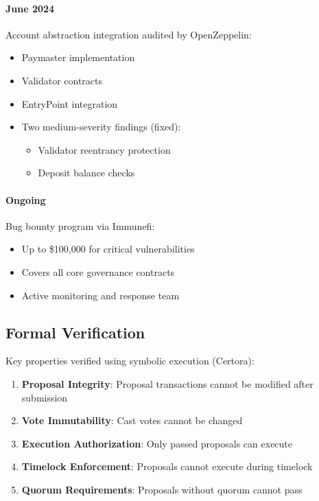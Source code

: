 \documentclass[11pt,a4paper]{article}
\begin{document}
\paragraph{June 2024} Account abstraction integration audited by OpenZeppelin:
\begin{itemize}
    \item Paymaster implementation
    \item Validator contracts
    \item EntryPoint integration
    \item Two medium-severity findings (fixed):
    \begin{itemize}
        \item Validator reentrancy protection
        \item Deposit balance checks
    \end{itemize}
\end{itemize}

\paragraph{Ongoing} Bug bounty program via Immunefi:
\begin{itemize}
    \item Up to \$100,000 for critical vulnerabilities
    \item Covers all core governance contracts
    \item Active monitoring and response team
\end{itemize}

\subsection{Formal Verification}

Key properties verified using symbolic execution (Certora):

\begin{enumerate}
    \item \textbf{Proposal Integrity}: Proposal transactions cannot be modified after submission
    \item \textbf{Vote Immutability}: Cast votes cannot be changed
    \item \textbf{Execution Authorization}: Only passed proposals can execute
    \item \textbf{Timelock Enforcement}: Proposals cannot execute during timelock
    \item \textbf{Quorum Requirements}: Proposals without quorum cannot pass
\end{enumerate}
\end{document}
